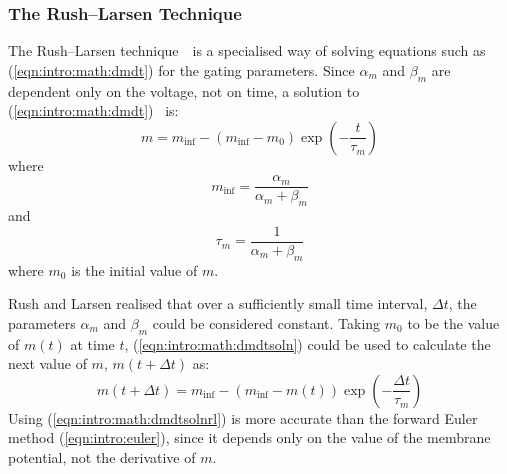 \subsubsection{The Rush--Larsen Technique}


The Rush--Larsen technique~\cite{RL78}\ is a specialised way of solving
equations such as (\ref{eqn:intro:math:dmdt}) for the gating parameters.
Since $\alpha_m$ and $\beta_m$ are dependent only on the voltage, not on time, a
solution to (\ref{eqn:intro:math:dmdt})~\cite{Hodgkin1952} is:
\begin{equation}
\label{eqn:intro:math:dmdtsoln}
m = m_{\inf} - \left(m_{\inf} - m_0\right)\exp\left(-\frac{t}{\tau_m}\right)
\end{equation}
where
\begin{equation}
\label{eqn:intro:math:infm}
m_{\inf} = \frac{\alpha_{m}}{\alpha_{m} + \beta_{m}}
\end{equation}
and
\begin{equation}
\label{eqn:intro:math:taum}
\tau_m = \frac{1}{\alpha_{m} + \beta_{m}}
\end{equation}
where $m_0$ is the initial value of $m$.

Rush and Larsen realised that over a sufficiently small time interval, $\Delta t$,
the parameters $\alpha_m$ and $\beta_m$ could be considered constant.
Taking $m_0$ to be the value of $m(t)$ at time $t$, (\ref{eqn:intro:math:dmdtsoln})
could be used to calculate the next value of $m$, $m(t + \Delta t)$ as:
\begin{equation}
\label{eqn:intro:math:dmdtsolnrl}
m(t+ \Delta t) = m_{\inf} - \left(m_{\inf} - m(t)\right)\exp\left(-\frac{\Delta t}{\tau_m}\right)
\end{equation}
Using (\ref{eqn:intro:math:dmdtsolnrl}) is more accurate than the forward Euler
method (\ref{eqn:intro:euler}), since it depends only on the value of the
membrane potential, not the derivative of $m$.

